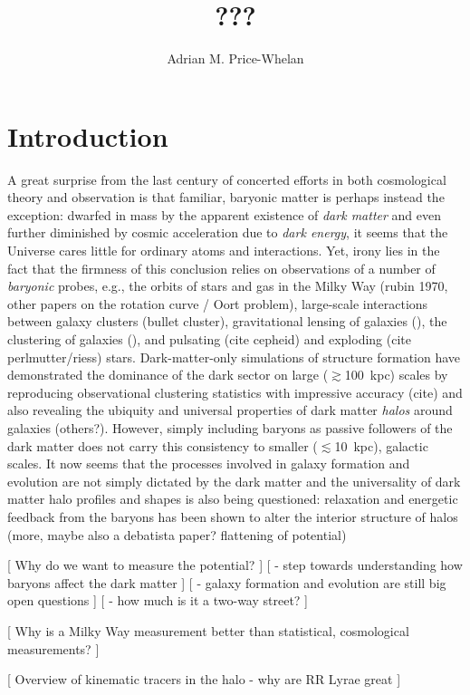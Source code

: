 \documentclass[letterpaper,12pt,preprint]{aastex}
\begin{document}
\title{???}
\author{Adrian M. Price-Whelan}

\section{Introduction}

A great surprise from the last century of concerted efforts in both cosmological theory and observation is that familiar, baryonic matter is perhaps instead the exception: dwarfed in mass by the apparent existence of \emph{dark matter} and even further diminished by cosmic acceleration due to \emph{dark energy}, it seems that the Universe cares little for ordinary atoms and interactions. Yet, irony lies in the fact that the firmness of this conclusion relies on observations of a number of \emph{baryonic} probes, e.g., the orbits of stars and gas in the Milky Way (rubin 1970, other papers on the rotation curve / Oort problem), large-scale interactions between galaxy clusters (bullet cluster), gravitational lensing of galaxies (), the clustering of galaxies (), and pulsating (cite cepheid) and exploding (cite perlmutter/riess) stars. Dark-matter-only simulations of structure formation have demonstrated the dominance of the dark sector on large ($\gtrsim$100~kpc) scales by reproducing observational clustering statistics with impressive accuracy (cite) and also revealing the ubiquity and universal properties of dark matter \emph{halos} around galaxies \citep{navarro96} (others?). However, simply including baryons as passive followers of the dark matter does not carry this consistency to smaller ($\lesssim$10~kpc), galactic scales. It now seems that the processes involved in galaxy formation and evolution are not simply dictated by the dark matter and the universality of dark matter halo profiles and shapes is also being questioned: relaxation and energetic feedback from the baryons has been shown to alter the interior structure of halos \citep[e.g.][]{bailin05, pontzen12} (more, maybe also a debatista paper? flattening of potential)

[ Why do we want to measure the potential? ]
[ - step towards understanding how baryons affect the dark matter ]
[ - galaxy formation and evolution are still big open questions ]
[ - how much is it a two-way street? ]

[ Why is a Milky Way measurement better than statistical, cosmological measurements? ]

[ Overview of kinematic tracers in the halo - why are RR Lyrae great ]
\end{document}
